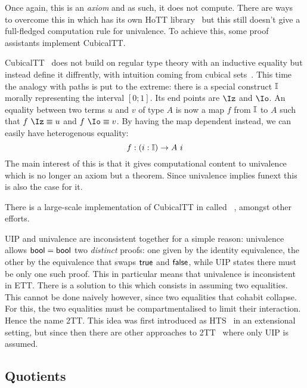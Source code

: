 Once again, this is an \emph{axiom} and as such, it does not compute.
There are ways~ to overcome this in
\Coq which has its own \acrshort{HoTT} library~
but this still doesn't give a full-fledged computation rule for univalence.
To achieve this, some proof assistants implement \acrlong{CubicalTT}.

 \acrshort{CubicalTT}~
does not build on regular type theory with an inductive equality but instead
define it diffrently, with intuition coming from cubical
sets~.
This time the analogy with paths is put to the extreme: there is a special
construct \(\mathbb{I}\) morally representing the interval \([0;1]\). Its end points
are \(\Iz\) and \(\Io\).
An equality between two terms \(u\) and \(v\) of type \(A\) is now a map \(f\)
from \(\mathbb{I}\) to \(A\) such that \(f\ \Iz \equiv u\) and \(f\ \Io \equiv v\).
By having the map dependent instead, we can easily have heterogenous equality:
\[
  f : (i : \mathbb{I}) \to A\ i
\]
The main interest of this is that it gives computational content to univalence
which is no longer an axiom but a theorem. Since univalence implies
\acrshort{funext} this is also the case for it.

There is a large-scale implementation of \acrshort{CubicalTT} in
\Agda called ~,
amongst other efforts.


\acrshort{UIP} and univalence are inconsistent together for a simple reason:
univalence allows \(\mathsf{bool} = \mathsf{bool}\) two \emph{distinct} proofs: one given by
the identity equivalence, the other by the equivalence that swaps \(\mathsf{true}\)
and \(\mathsf{false}\), while \acrshort{UIP} states there must be only one such proof.
This in particular means that univalence is inconsistent in \acrshort{ETT}.
There is a solution to this which consists in assuming two equalities.
This cannot be done naively however, since two equalities that cohabit
collapse.
For this, the two equalities must be compartmentalised to limit their
interaction. Hence the name \acrfull{2TT}.
This idea was first introduced as \acrfull{HTS}~ in
an extensional setting, but since then there are other approaches to
\acrshort{2TT}~
where only \acrshort{UIP} is assumed.

\subsection{Quotients}

